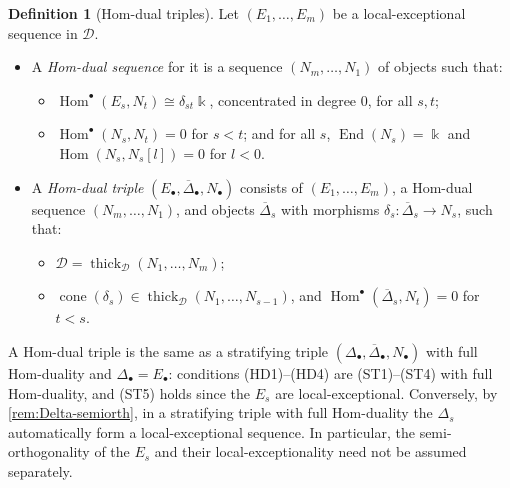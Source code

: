 \documentclass[11pt,reqno]{amsart}
\theoremstyle{plain}
\theoremstyle{definition}
\newtheorem{definition}[theorem]{Definition}
\theoremstyle{remark}
\newcommand{\kk}{\Bbbk}
\DeclareMathOperator{\Hom}{Hom}
\DeclareMathOperator{\End}{End}
\DeclareMathOperator{\cone}{cone}
\newcommand{\thick}[2][\cD]{\operatorname{thick}_{#1}(#2)}
\newcommand{\Deltabar}{\overline{\Delta}}
\newcommand{\cD}{\mathcal{D}}
\begin{document}
\begin{definition}[Hom-dual triples]\label{def:hom-dual}
Let $(E_1,\dots,E_m)$ be a local-exceptional sequence in $\cD$.
\begin{itemize}
\item A \emph{Hom-dual sequence} for it is a sequence $(N_m,\dots,N_1)$ of objects such that:
\begin{itemize}
\item[\textup{(HD1)}] $\Hom^\bullet(E_s,N_t)\cong\delta_{st}\kk$, concentrated in degree $0$, for all $s,t$;
\item[\textup{(HD2)}] $\Hom^\bullet(N_s,N_t)=0$ for $s<t$; and for all $s$, $\End(N_s)=\kk$ and $\Hom(N_s,N_s[l])=0$ for $l<0$.
\end{itemize}
\item A \emph{Hom-dual triple} $(E_\bullet,\Deltabar_\bullet,N_\bullet)$ consists of $(E_1,\dots,E_m)$, a Hom-dual sequence $(N_m,\dots,N_1)$, and objects $\Deltabar_s$ with morphisms $\delta_s\colon\Deltabar_s\to N_s$, such that:
\begin{itemize}
\item[\textup{(HD3)}] $\cD=\thick{N_1,\dots,N_m}$;
\item[\textup{(HD4)}] $\cone(\delta_s)\in\thick{N_1,\dots,N_{s-1}}$, and $\Hom^\bullet(\Deltabar_s,N_t)=0$ for $t<s$.
\end{itemize}
\end{itemize}
\end{definition}

A Hom-dual triple is the same as a stratifying triple $(\Delta_\bullet,\Deltabar_\bullet,N_\bullet)$ with full Hom-duality and $\Delta_\bullet=E_\bullet$: conditions (HD1)--(HD4) are (ST1)--(ST4) with full Hom-duality, and (ST5) holds since the $E_s$ are local-exceptional. Conversely, by \cref{rem:Delta-semiorth}, in a stratifying triple with full Hom-duality the $\Delta_s$ automatically form a local-exceptional sequence. In particular, the semi-orthogonality of the $E_s$ and their local-exceptionality need not be assumed separately.
\end{document}

